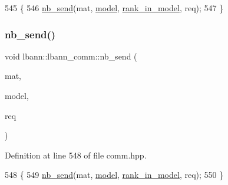 \begin{DoxyCode}
545                                                                        \{
546     \hyperlink{classlbann_1_1lbann__comm_a70679ca6477c56972f9bc53d52e5ce21}{nb\_send}(mat, \hyperlink{namespacelbann_adee41f31f15f3906cbdcce4a1417eb56a20f35e630daf44dbfa4c3f68f5399d8c}{model}, \hyperlink{classlbann_1_1lbann__comm_a0dcccd57c2b591eb7682e192e0a09033}{rank\_in\_model}, req);
547   \}
\end{DoxyCode}
\mbox{\label{classlbann_1_1lbann__comm_a1144c161ccc147d879d088b5832d64a7}} 
\subsubsection{\texorpdfstring{nb\+\_\+send()}{nb\_send()}\hspace{0.1cm}{\footnotesize\ttfamily [6/6]}}
{\footnotesize\ttfamily void lbann\+::lbann\+\_\+comm\+::nb\+\_\+send (\begin{DoxyParamCaption}\item[{const \hyperlink{base_8hpp_a0fab5387556805cfeac3e7e567bf66c5}{Dist\+Mat} \&}]{mat,  }\item[{int}]{model,  }\item[{El\+::mpi\+::\+Request$<$ Data\+Type $>$ \&}]{req }\end{DoxyParamCaption})\hspace{0.3cm}{\ttfamily [inline]}}



Definition at line 548 of file comm.\+hpp.


\begin{DoxyCode}
548                                                                            \{
549     \hyperlink{classlbann_1_1lbann__comm_a70679ca6477c56972f9bc53d52e5ce21}{nb\_send}(mat, \hyperlink{namespacelbann_adee41f31f15f3906cbdcce4a1417eb56a20f35e630daf44dbfa4c3f68f5399d8c}{model}, \hyperlink{classlbann_1_1lbann__comm_a0dcccd57c2b591eb7682e192e0a09033}{rank\_in\_model}, req);
550   \}
\end{DoxyCode}
\mbox{\label{classlbann_1_1lbann__comm_ae5373895ee134866be9f2b042a1cef21}} 
